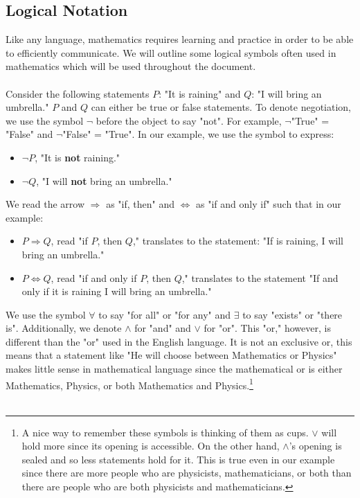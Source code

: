\documentclass{tufte-handout} %
\theoremstyle{definition}
\theoremstyle{remark}
\begin{document}
\subsection{Logical Notation}
Like any language, mathematics requires learning and practice in order to be able to efficiently communicate. We will outline some logical symbols often used in mathematics which will be used throughout the document.\\\\
Consider the following statements $P$: "It is raining" and $Q$: "I will bring an umbrella." $P$ and $Q$ can either be true or false statements. 
To denote negotiation, we use the symbol $\neg$ before the object to say "not". For example, $\neg$"True" = "False" and $\neg$"False" = "True". In our example, we use the symbol to express:  
\begin{itemize}
    \item $\neg P$, "It is \textbf{not} raining."
    \item $\neg Q$, "I will \textbf{not} bring an umbrella."
\end{itemize}
We read the arrow $\Rightarrow$ as "if, then" and $\Longleftrightarrow$ as "if and only if" such that in our example:
\begin{itemize}
    \item \(P \Rightarrow Q\), read "if $P$, then $Q$," translates to the statement: "If is raining, I will bring an umbrella." 
    \item \(P \Longleftrightarrow Q\), read "if and only if $P$, then $Q$," translates to the statement "If and only if it is raining I will bring an umbrella." 
\end{itemize}
We use the symbol $\forall$ to say "for all" or "for any" and $\exists$ to say "exists" or "there is". Additionally, we denote $\wedge$ for "and" and $\vee$ for "or". This "or," however, is different than the "or" used in the English language. It is not an exclusive or, this means that a statement like "He will choose between Mathematics or Physics" makes little sense in mathematical language since the mathematical or is either Mathematics, Physics, or both Mathematics and Physics.\footnote{A nice way to remember these symbols is thinking of them as cups. $\vee$ will hold more since its opening is accessible. On the other hand, $\wedge$'s opening is sealed and so less statements hold for it. This is true even in our example since there are more people who are physicists, mathematicians, or both than there are people who are both physicists and mathematicians.} \\\\
\end{document}
